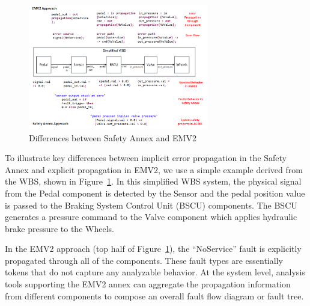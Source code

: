 
\begin{figure}[t]
	\centering
	\includegraphics[width=0.7\textwidth]{images/Comparison_with_EMV2.png}
	\caption{Differences between Safety Annex and EMV2}
	\label{fig:comparison_with_EMV2}
\end{figure} 

To illustrate key differences between implicit error propagation in the Safety Annex and explicit propagation in  EMV2, we use a simple example derived from the WBS, shown in Figure~\ref{fig:comparison_with_EMV2}. 
In this simplified WBS system, the physical signal from the Pedal component is detected by the Sensor and the pedal position value is passed to the Braking System Control Unit (BSCU) components.  The BSCU generates a pressure command to the Valve component which applies hydraulic brake pressure to the Wheels. 

In the EMV2 approach (top half of Figure~\ref{fig:comparison_with_EMV2}), the ``NoService'' fault is explicitly propagated through all of the components. These fault types are essentially tokens that do not capture any analyzable behavior. At the system level, analysis tools supporting the EMV2 annex can aggregate the propagation information from different components to compose an overall fault flow diagram or fault tree. 

